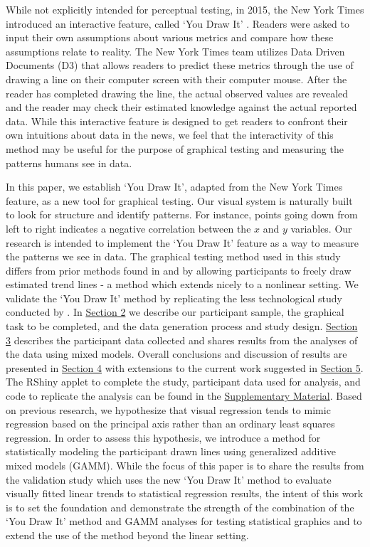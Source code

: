 \documentclass[12pt]{article}
\begin{document}
While not explicitly intended for perceptual testing, in 2015, the New
York Times introduced an interactive feature, called `You Draw It'
\citep{aisch_cox_quealy_2015, buchanan_park_pearce_2017, katz_2017}.
Readers were asked to input their own assumptions about various metrics
and compare how these assumptions relate to reality. The New York Times
team utilizes Data Driven Documents (D3) \citep{bostock2011d3} that
allows readers to predict these metrics through the use of drawing a
line on their computer screen with their computer mouse. After the
reader has completed drawing the line, the actual observed values are
revealed and the reader may check their estimated knowledge against the
actual reported data. While this interactive feature is designed to get
readers to confront their own intuitions about data in the news, we feel
that the interactivity of this method may be useful for the purpose of
graphical testing and measuring the patterns humans see in data.

In this paper, we establish `You Draw It', adapted from the New York
Times feature, as a new tool for graphical testing. Our visual system is
naturally built to look for structure and identify patterns. For
instance, points going down from left to right indicates a negative
correlation between the \(x\) and \(y\) variables. Our research is
intended to implement the `You Draw It' feature as a way to measure the
patterns we see in data. The graphical testing method used in this study
differs from prior methods found in \citet{mosteller1981eye} and
\citet{ciccione2021can} by allowing participants to freely draw
estimated trend lines - a method which extends nicely to a nonlinear
setting. We validate the `You Draw It' method by replicating the less
technological study conducted by \citet{mosteller1981eye}. In
\protect\hyperlink{methods}{Section 2} we describe our participant
sample, the graphical task to be completed, and the data generation
process and study design. \protect\hyperlink{results}{Section 3}
describes the participant data collected and shares results from the
analyses of the data using mixed models. Overall conclusions and
discussion of results are presented in
\protect\hyperlink{conclusion-discussion}{Section 4} with extensions to
the current work suggested in \protect\hyperlink{future-work}{Section
5}. The RShiny applet to complete the study, participant data used for
analysis, and code to replicate the analysis can be found in the
\protect\hyperlink{supplementary-material}{Supplementary Material}.
Based on previous research, we hypothesize that visual regression tends
to mimic regression based on the principal axis rather than an ordinary
least squares regression. In order to assess this hypothesis, we
introduce a method for statistically modeling the participant drawn
lines using generalized additive mixed models (GAMM). While the focus of
this paper is to share the results from the validation study which uses
the new `You Draw It' method to evaluate visually fitted linear trends
to statistical regression results, the intent of this work is to set the
foundation and demonstrate the strength of the combination of the `You
Draw It' method and GAMM analyses for testing statistical graphics and
to extend the use of the method beyond the linear setting.
\end{document}
